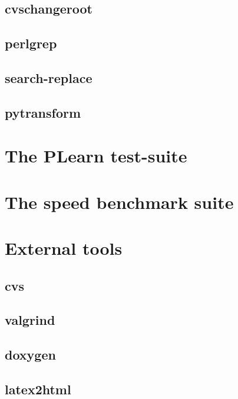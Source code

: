 \documentclass[11pt]{book}
\begin{document}
\section{cvschangeroot}

\section{perlgrep}

\section{search-replace}

\section{pytransform}


\chapter{The PLearn test-suite }


\chapter{The speed benchmark suite}


\chapter{External tools}

\section{cvs}

\section{valgrind}

\section{doxygen}

\section{latex2html}
\end{document}
